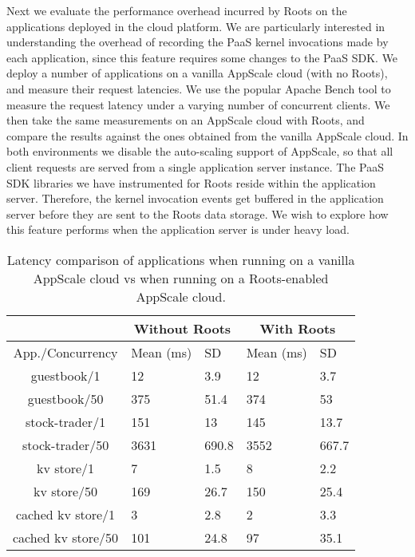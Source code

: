 Next we evaluate the performance overhead incurred by Roots on the applications deployed in the 
cloud platform. We are particularly interested in understanding the overhead of recording the PaaS kernel
invocations made by each application, since this feature requires some changes to the PaaS SDK. 
We deploy a number of applications on a vanilla
AppScale cloud (with no Roots), and measure their request latencies. We use
the popular Apache Bench tool to measure the request latency under a
varying number of concurrent clients. We then take the same measurements
on an AppScale cloud with Roots, and compare the results against the ones obtained
from the vanilla AppScale cloud. In both environments we disable the auto-scaling
support of AppScale, so that all client requests are served from a single application
server instance. The PaaS SDK libraries we have instrumented for Roots reside within
the application server. Therefore, the kernel invocation events get buffered in
the application server before they are sent to the Roots data storage. We wish to
explore how this feature performs when the application server is under heavy load.

\begin{table}
\begin{center}
\begin{tabular}{|c|p{0.8cm}|p{0.8cm}|p{0.8cm}|p{0.8cm}|}
\hline &
      \multicolumn{2}{c|}{Without Roots} &
      \multicolumn{2}{c|}{With Roots} \\ \hline
    App./Concurrency & Mean (ms) & SD & Mean (ms) & SD\\

\hline
guestbook/1 & 12 & 3.9 & 12 & 3.7 \\ \hline
guestbook/50 & 375 & 51.4 & 374 & 53 \\ \hline
stock-trader/1 & 151 & 13 & 145 & 13.7 \\ \hline
stock-trader/50 & 3631 & 690.8 & 3552 & 667.7 \\ \hline
kv store/1 & 7 & 1.5 & 8 & 2.2 \\ \hline
kv store/50 & 169 & 26.7  & 150 & 25.4  \\ \hline
cached kv store/1 & 3 & 2.8 & 2 & 3.3 \\ \hline
cached kv store/50 & 101 & 24.8 & 97 & 35.1  \\ \hline
\end{tabular}
\end{center}
\caption{Latency comparison of applications when running on
a vanilla AppScale cloud vs when running on a Roots-enabled
AppScale cloud.
\label{tab:perf_overhead}
}
\end{table}

